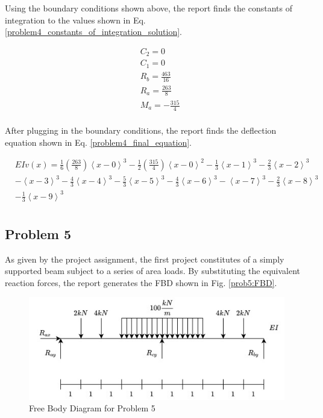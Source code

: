 \documentclass[a4paper]{article}
\begin{document}
Using the boundary conditions shown above, the report finds the constants of integration to the values shown in Eq. \ref{problem4_constants_of_integration_solution}.

\begin{equation}
\begin{split}
	& C_2 = 0 \\
	& C_1 = 0 \\
	& R_b = \frac{463}{16}\\
	& R_a = \frac{263}{8}\\
	& M_a = -\frac{315}{4}\\
\end{split}
\label{problem4_constants_of_integration_solution}
\end{equation}

After plugging in the boundary conditions, the report finds the deflection equation shown in Eq. \ref{problem4_final_equation}.

\begin{equation}
\begin{split}
  & EI v(x) = \frac{1}{6}\left(\frac{263}{8}\right)\left<x-0\right>^3 - \frac{1}{2}\left(\frac{315}{4}\right)\left<x-0\right>^2 - \frac{1}{3}\left<x-1\right>^3 - \frac{2}{3}\left<x-2\right>^3 \\
& - \left<x-3\right>^3 - \frac{4}{3}\left<x-4\right>^3 - \frac{5}{3}\left<x-5\right>^3  -  \frac{4}{3}\left<x-6\right>^3 - \left<x-7\right>^3 -  \frac{2}{3}\left<x-8\right>^3  \\
& - \frac{1}{3}\left<x-9\right>^3 \\
\end{split}
\label{problem4_final_equation}
\end{equation}



\subsection{Problem 5}

As given by the project assignment, the first project constitutes of a simply supported beam subject to a series of area loads. By substituting the equivalent reaction forces, the report generates the FBD shown in Fig. \ref{prob5:FBD}.

\begin{figure}[h]
\includegraphics[width=\textwidth]{FBD/FBD_5.jpg}
\caption{Free Body Diagram for Problem 5}
\label{FBD_5}
\end{figure}
\end{document}
